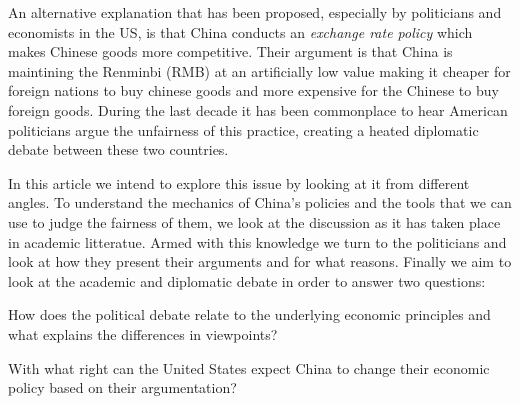 An alternative explanation that has been proposed, especially by 
politicians and economists in the US, is that China conducts an 
\emph{exchange rate policy} which makes Chinese goods more competitive.
Their argument is that China is maintining the Renminbi (RMB) at an 
artificially low value making it cheaper for foreign nations to buy 
chinese goods and more expensive for the Chinese to buy foreign goods.  
During the last decade it has been commonplace to hear American 
politicians argue the unfairness of this practice, creating a heated 
diplomatic debate between these two countries.

In this article we intend to explore this issue by looking at it from 
different angles. To understand the mechanics of China's policies and 
the tools that we can use to judge the fairness of them, we look at the 
discussion as it has taken place in academic litteratue. Armed with this 
knowledge we turn to the politicians and look at how they present their 
arguments and for what reasons. Finally we aim to look at the academic 
and diplomatic debate in order to answer two questions:

\begin{enumeration}
\item{How does the political debate relate to the underlying economic 
principles and what explains the differences in viewpoints?}
\item{With what right can the United States expect China to change their 
economic policy based on their argumentation?}
\end{enumeration}
